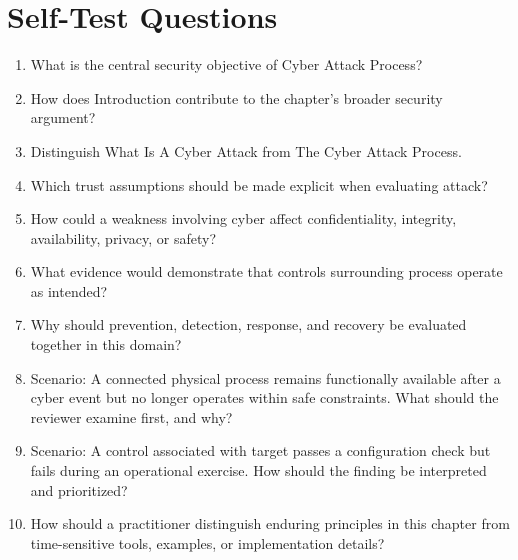 \documentclass[11pt]{article}
\begin{document}
\section*{Self-Test Questions}
\begin{enumerate}
\item What is the central security objective of Cyber Attack Process?
\item How does Introduction contribute to the chapter's broader security argument?
\item Distinguish What Is A Cyber Attack from The Cyber Attack Process.
\item Which trust assumptions should be made explicit when evaluating attack?
\item How could a weakness involving cyber affect confidentiality, integrity, availability, privacy, or safety?
\item What evidence would demonstrate that controls surrounding process operate as intended?
\item Why should prevention, detection, response, and recovery be evaluated together in this domain?
\item Scenario: A connected physical process remains functionally available after a cyber event but no longer operates within safe constraints. What should the reviewer examine first, and why?
\item Scenario: A control associated with target passes a configuration check but fails during an operational exercise. How should the finding be interpreted and prioritized?
\item How should a practitioner distinguish enduring principles in this chapter from time-sensitive tools, examples, or implementation details?
\end{enumerate}
\end{document}
